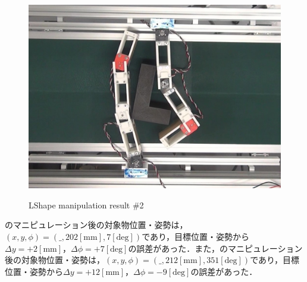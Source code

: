 \documentclass[a4paper,twoside,12pt,papersize, dvipdfmx]{iirthesis}
\begin{document}
\begin{figure}[hbt]
\begin{minipage}{0.249\hsize}
\subcaption{}\label{}
\end{minipage}\hfill
\begin{minipage}{0.249\hsize}
\centering
\includegraphics[width=0.98\hsize]{fig/4-manipulation-result/LShape/2-4.jpg}
\subcaption{}\label{}
\end{minipage}
\caption{LShape manipulation result \#2}\label{fig::result::lm2}
\end{figure}

のマニピュレーション後の対象物位置・姿勢は，$(x, y, \phi) = (\_, 202 \mathrm{[mm]}, 7 \mathrm{[deg]})$であり，目標位置・姿勢から$\Delta y = +2 \mathrm{[mm]}$，$\Delta \phi = +7 \mathrm{[deg]}$の誤差があった．また，のマニピュレーション後の対象物位置・姿勢は，$(x, y, \phi) = (\_, 212 \mathrm{[mm]}, 351 \mathrm{[deg]})$であり，目標位置・姿勢から$\Delta y = +12 \mathrm{[mm]}$，$\Delta \phi = -9 \mathrm{[deg]}$の誤差があった．\par
\end{document}

